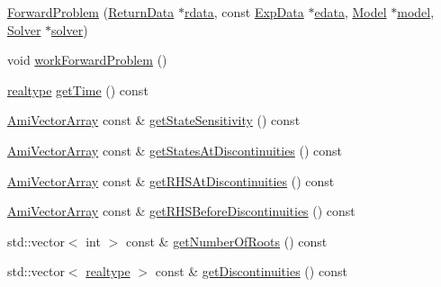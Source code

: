 \begin{DoxyCompactItemize}
\item 
\mbox{\hyperlink{classamici_1_1_forward_problem_a315030da8410dce7baa8eb1dd630994b}{Forward\+Problem}} (\mbox{\hyperlink{classamici_1_1_return_data}{Return\+Data}} $\ast$\mbox{\hyperlink{classamici_1_1_forward_problem_a4c0807651f0594a186e8856f22e442cc}{rdata}}, const \mbox{\hyperlink{classamici_1_1_exp_data}{Exp\+Data}} $\ast$\mbox{\hyperlink{classamici_1_1_forward_problem_a9ec6aee8cd7c91d0e49aed6e3d0db4ce}{edata}}, \mbox{\hyperlink{classamici_1_1_model}{Model}} $\ast$\mbox{\hyperlink{classamici_1_1_forward_problem_a7b56c3ca57dde73bdbc8dbe9772bca19}{model}}, \mbox{\hyperlink{classamici_1_1_solver}{Solver}} $\ast$\mbox{\hyperlink{classamici_1_1_forward_problem_ae1ad25a4dd6b076c27672dc94d11dad0}{solver}})
\item 
void \mbox{\hyperlink{classamici_1_1_forward_problem_a4ef001eef23bc48270159d6193036858}{work\+Forward\+Problem}} ()
\item 
\mbox{\hyperlink{namespaceamici_a1bdce28051d6a53868f7ccbf5f2c14a3}{realtype}} \mbox{\hyperlink{classamici_1_1_forward_problem_a1bc77462943aa0bae032ffa5d6e887ee}{get\+Time}} () const
\item 
\mbox{\hyperlink{classamici_1_1_ami_vector_array}{Ami\+Vector\+Array}} const  \& \mbox{\hyperlink{classamici_1_1_forward_problem_a3c364a12c650f9f247f664cedb6d81d3}{get\+State\+Sensitivity}} () const
\item 
\mbox{\hyperlink{classamici_1_1_ami_vector_array}{Ami\+Vector\+Array}} const  \& \mbox{\hyperlink{classamici_1_1_forward_problem_ae983e618f5d4161e92b3a86f4abd1048}{get\+States\+At\+Discontinuities}} () const
\item 
\mbox{\hyperlink{classamici_1_1_ami_vector_array}{Ami\+Vector\+Array}} const  \& \mbox{\hyperlink{classamici_1_1_forward_problem_aaf71ce300e66a3034148c77417294897}{get\+R\+H\+S\+At\+Discontinuities}} () const
\item 
\mbox{\hyperlink{classamici_1_1_ami_vector_array}{Ami\+Vector\+Array}} const  \& \mbox{\hyperlink{classamici_1_1_forward_problem_a082b9f4f0d51fc8e2bf46f9f8e700d06}{get\+R\+H\+S\+Before\+Discontinuities}} () const
\item 
std\+::vector$<$ int $>$ const  \& \mbox{\hyperlink{classamici_1_1_forward_problem_ac5b41527ea8caadc2484221795a9e94f}{get\+Number\+Of\+Roots}} () const
\item 
std\+::vector$<$ \mbox{\hyperlink{namespaceamici_a1bdce28051d6a53868f7ccbf5f2c14a3}{realtype}} $>$ const  \& \mbox{\hyperlink{classamici_1_1_forward_problem_abe84b94f1305622d5b143081992d495b}{get\+Discontinuities}} () const

\end{DoxyCompactItemize}
